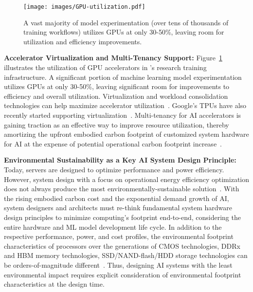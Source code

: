 \begin{figure}[t]
    \centering
    \texttt{[image: images/GPU-utilization.pdf]}
    \caption{A vast majority of model experimentation (over tens of thousands of training workflows) utilizes GPUs at only 30-50\%, leaving room for utilization and efficiency improvements.}
    \label{fig:gpu-utilization}
\end{figure}

\textbf{Accelerator Virtualization and Multi-Tenancy Support:} Figure~\ref{fig:gpu-utilization} illustrates the utilization of GPU accelerators in \fb's research training infrastructure. A significant portion of machine learning model experimentation utilizes GPUs at only 30-50\%, leaving significant room for improvements to efficiency and overall utilization. Virtualization and workload consolidation technologies can help maximize accelerator utilization~\cite{GPU-vm}. Google's TPUs have also recently started supporting virtualization~\cite{TPU-vm}. Multi-tenancy for AI accelerators is gaining traction as an effective way to improve resource utilization, thereby amortizing the upfront embodied carbon footprint of customized system hardware for AI at the expense of potential operational carbon footprint increase~\cite{Gschwind:jrd:2017,Ghodrati:micro:2020,Kao:arxiv:2021,Jeon:usenix:2019,Yu:arxiv:2019}.

\textbf{Environmental Sustainability as a Key AI System Design Principle:}
Today, servers are designed to optimize performance and power efficiency. 
However, system design with a focus on operational energy efficiency optimization does not always produce the most environmentally-sustainable solution~\cite{jain:mobicom:2002,Chang:hotpower:2010,Gupta:HPCA:2021}.
With the rising embodied carbon cost and the exponential demand growth of AI, system designers and architects must re-think fundamental system hardware design principles to minimize computing’s footprint end-to-end, considering the entire hardware and ML model development life cycle. In addition to the respective performance, power, and cost profiles, the environmental footprint characteristics of processors over the generations of CMOS technologies, DDRx and HBM memory technologies, SSD/NAND-flash/HDD storage technologies can be orders-of-magnitude different~\cite{Bardon:iedm:2020}. Thus, designing AI systems with the least environmental impact requires explicit consideration of environmental footprint characteristics at the design time. 


